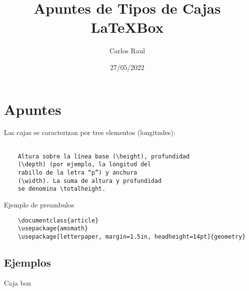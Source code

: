 \documentclass[letterpaper,12pt]{article}
\title{Apuntes de Tipos de Cajas \LaTeX{Box}}
\author{Carlos Raul}
\date{27/05/2022}
\begin{document}
\maketitle
    \section{Apuntes}
    Las cajas se caracterizan por tres
elementos (longitudes):
\begin{verbatim}
    
    Altura sobre la línea base (\height), profundidad
    (\depth) (por ejemplo, la longitud del
    rabillo de la letra “p”) y anchura
    (\width). La suma de altura y profundidad
    se denomina \totalheight.
\end{verbatim} 
Ejemplo de preambulos
\begin{verbatim}
    \documentclass{article}
    \usepackage{amsmath}
    \usepackage[letterpaper, margin=1.5in, headheight=14pt]{geometry}
\end{verbatim}

    \subsection{Ejemplos}
    Caja box 
\end{document}
